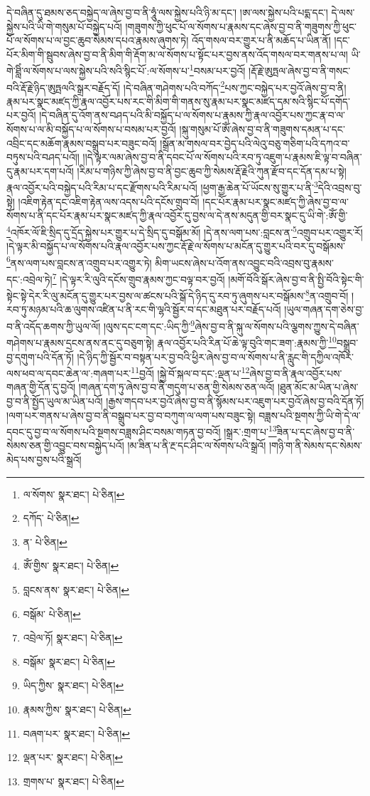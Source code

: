 དེ་བཞིན་དུ་ཐམས་ཅད་བསྐྱེད་ལ་ཞེས་བྱ་བ་ནི་ཧཱུཾ་ལས་སྐྱེས་པའི་ཉི་མ་དང་། །ཨ་ལས་སྐྱེས་པའི་པདྨ་དང་། དེ་ལས་སྐྱེས་པའི་ཡི་གེ་གསུམ་པོ་བསྐྱེད་པའོ། །གཟུགས་ཀྱི་ཕུང་པོ་ལ་སོགས་པ་རྣམས་དང་ཞེས་བྱ་བ་ནི་གཟུགས་ཀྱི་ཕུང་པོ་ལ་སོགས་པ་ལ་བྱང་ཆུབ་སེམས་དཔའ་རྣམས་ཞུགས་ཏེ། འོད་གསལ་བར་གྱུར་པ་ནི་མཆོད་པ་ཡིན་ནོ། །དང་པོར་མིག་གི་སྦུབས་ཞེས་བྱ་བ་ནི་མིག་གི་རྡོག་མ་ལ་སོགས་པ་སྟོང་པར་བྱས་ནས་འོད་གསལ་བར་གནས་པ་ལ། ཡི་གེ་ཐླིཾ་ལ་སོགས་པ་ལས་སྐྱེས་པའི་སའི་སྙིང་པོ་:ལ་སོགས་པ་\footnote{ལ་སོགས་  སྣར་ཐང་།  པེ་ཅིན། }བསམ་པར་བྱའོ། །རྡོ་རྗེ་ཨུཏྤལ་ཞེས་བྱ་བ་ནི་གསང་བའི་རྡོ་རྗེ་ཉིད་ཨུཏྤལའི་སྒྲར་བརྗོད་དོ། །དེ་བཞིན་གཤེགས་པའི་བཀོད་\footnote{དཀོད་  པེ་ཅིན། }པས་ཀྱང་བསྐྱེད་པར་བྱའོ་ཞེས་བྱ་བ་ནི། རྣམ་པར་སྣང་མཛད་ཀྱི་རྣལ་འབྱོར་པས་རང་གི་མིག་གི་གནས་སུ་རྣམ་པར་སྣང་མཛད་དམ་སའི་སྙིང་པོ་དགོད་པར་བྱའོ། །དེ་བཞིན་དུ་འོག་ནས་བཤད་པའི་མི་བསྐྱོད་པ་ལ་སོགས་པ་རྣམས་ཀྱི་རྣལ་འབྱོར་པས་ཀྱང་རྣ་བ་ལ་སོགས་པ་ལ་མི་བསྐྱོད་པ་ལ་སོགས་པ་བསམ་པར་བྱའོ། །སྐུ་གསུམ་པོ་ཨོཾ་ཞེས་བྱ་བ་ནི་གཟུགས་དམན་པ་དང་འབྲིང་དང་མཆོག་རྣམས་བསྒྲུབ་པར་བཟུང་བའོ། །སྒྲོན་མ་གསལ་བར་བྱེད་པའི་ལེའུ་བཅུ་གཅིག་པའི་དཀའ་བ་བཏུས་པའི་བཤད་པའོ།། །།དེ་ལྟར་ལམ་ཞེས་བྱ་བ་ནི་དབང་པོ་ལ་སོགས་པའི་རབ་ཏུ་འཇུག་པ་རྣམས་ཇི་ལྟ་བ་བཞིན་དུ་རྣམ་པར་དག་པའོ། །རིམ་པ་གཉིས་ཀྱི་ཞེས་བྱ་བ་ནི་བྱང་ཆུབ་ཀྱི་སེམས་རྡོ་རྗེའི་ཀུན་རྫོབ་དང་དོན་དམ་པ་སྟེ། རྣལ་འབྱོར་པའི་བསྐྱེད་པའི་རིམ་པ་དང་རྫོགས་པའི་རིམ་པའོ། །ཕྱག་རྒྱ་ཆེན་པོ་ཡོངས་སུ་གྱུར་པ་ནི་\footnote{ན་  པེ་ཅིན། }དེའི་འབྲས་བུ་སྟེ། །འཇིག་རྟེན་དང་འཇིག་རྟེན་ལས་འདས་པའི་དངོས་གྲུབ་བོ། །དང་པོར་རྣམ་པར་སྣང་མཛད་ཀྱི་ཞེས་བྱ་བ་ལ་སོགས་པ་ནི་དང་པོར་རྣམ་པར་སྣང་མཛད་ཀྱི་རྣལ་འབྱོར་དུ་བྱས་ལ་དེ་ནས་མདུན་གྱི་བར་སྣང་དུ་ཡི་གེ་:ཨོཾ་གྱི་\footnote{ཨོཾ་གྱིས་  སྣར་ཐང་།  པེ་ཅིན། }འཁོར་ལོ་ཇི་སྲིད་དུ་དྲོད་སྐྱེས་པར་གྱུར་པ་དེ་སྲིད་དུ་བསྒོམ་མོ། །དེ་ནས་ལག་པས་:བླངས་ན་\footnote{བླངས་ནས་  སྣར་ཐང་།  པེ་ཅིན། }འགྲུབ་པར་འགྱུར་རོ། །དེ་ལྟར་མི་བསྐྱོད་པ་ལ་སོགས་པའི་རྣལ་འབྱོར་པས་ཀྱང་རྡོ་རྗེ་ལ་སོགས་པ་མངོན་དུ་གྱུར་པའི་བར་དུ་བསྒོམས་\footnote{བསྒོམ་  པེ་ཅིན། }ནས་ལག་པས་བླངས་ན་འགྲུབ་པར་འགྱུར་ཏེ། མིག་ཡངས་ཞེས་པ་འོག་ནས་འབྱུང་བའི་འབྲས་བུ་རྣམས་དང་:འབྲེལ་ཏེ།\footnote{འབྲེལ་ཏོ།  སྣར་ཐང་།  པེ་ཅིན། } །དེ་ལྟར་རི་ལུའི་དངོས་གྲུབ་རྣམས་ཀྱང་བལྟ་བར་བྱའོ། །མགོ་བོའི་སྒོར་ཞེས་བྱ་བ་ནི་སྤྱི་བོའི་སྟེང་གི་སྟེང་སྟེ་དེར་རི་ལུ་མངོན་དུ་གྱུར་པར་བྱས་ལ་ཚངས་པའི་སྒོ་དེ་ཉིད་དུ་རབ་ཏུ་ཞུགས་པར་བསྒོམས་\footnote{བསྒོམ་  སྣར་ཐང་།  པེ་ཅིན། }ན་འགྲུབ་བོ། །རབ་ཏུ་མཉམ་པའི་ཆ་ལུགས་འཛིན་པ་ནི་རང་གི་ལྷའི་སྦྱོར་བ་དང་མཐུན་པར་བརྗོད་པའོ། །ཡུལ་གཞན་དག་ཅེས་བྱ་བ་ནི་འདོད་ཆགས་ཀྱི་ཡུལ་ལོ། །ལུས་དང་ངག་དང་:ཡིད་ཀྱི་\footnote{ཡིད་ཀྱིས་  སྣར་ཐང་།  པེ་ཅིན། }ཞེས་བྱ་བ་ནི་སྐུ་ལ་སོགས་པའི་ལྕགས་ཀྱུས་དེ་བཞིན་གཤེགས་པ་རྣམས་དྲངས་ནས་ནང་དུ་བཅུག་སྟེ། རྣལ་འབྱོར་པའི་རིན་པོ་ཆེ་ལྟ་བུའི་གང་ཟག་:རྣམས་ཀྱི་\footnote{རྣམས་ཀྱིས་  སྣར་ཐང་།  པེ་ཅིན། }བསྒྲུབ་བྱ་དགུག་པའི་དོན་ཏོ། །དེ་ཉིད་ཀྱི་སྦྱོར་བ་བསྟན་པར་བྱ་བའི་ཕྱིར་ཞེས་བྱ་བ་ལ་སོགས་པ་ནི་རླུང་གི་དཀྱིལ་འཁོར་ལས་ཕབ་ལ་དབང་ཆེན་ལ་:གཞག་པར་\footnote{བཞག་པར་  སྣར་ཐང་།  པེ་ཅིན། }བྱའོ། །སྐྱེ་བོ་སྐལ་བ་དང་:ལྡན་པ་\footnote{ལྡན་པར་  སྣར་ཐང་།  པེ་ཅིན། }ཞེས་བྱ་བ་ནི་རྣལ་འབྱོར་པས་གཞན་གྱི་དོན་དུ་བྱའོ། །གཞན་དག་ཏུ་ཞེས་བྱ་བ་ནི་གདུག་པ་ཅན་གྱི་སེམས་ཅན་ལའོ། །ཐུན་མོང་མ་ཡིན་པ་ཞེས་བྱ་བ་ནི་སྤྱོད་ཡུལ་མ་ཡིན་པའོ། །རྒྱས་གདབ་པར་བྱའོ་ཞེས་བྱ་བ་ནི་སྙོམས་པར་འཇུག་པར་བྱའོ་ཞེས་བྱ་བའི་དོན་ཏོ། །ལག་པར་གནས་པ་ཞེས་བྱ་བ་ནི་བསྒྲུབ་པར་བྱ་བ་བཀུག་ལ་ལག་པས་བཟུང་སྟེ། བཟླས་པའི་སྔགས་ཀྱི་ཡི་གེ་དེ་ལ་དབང་དུ་བྱ་བ་ལ་སོགས་པའི་སྔགས་བཟླས་ཤིང་བསམ་གཏན་བྱ་བའོ། །སྒྲར་:གྲག་པ་\footnote{གྲགས་པ་  སྣར་ཐང་།  པེ་ཅིན། }ཟིན་པ་དང་ཞེས་བྱ་བ་ནི་སེམས་ཅན་གྱི་འབྱུང་བས་བསྐྱེད་པའོ། །མ་ཟིན་པ་ནི་རྔ་དང་ཤིང་ལ་སོགས་པའི་སྒྲའོ། །གཉི་ག་ནི་སེམས་དང་སེམས་མེད་པས་བྱས་པའི་སྒྲའོ། 